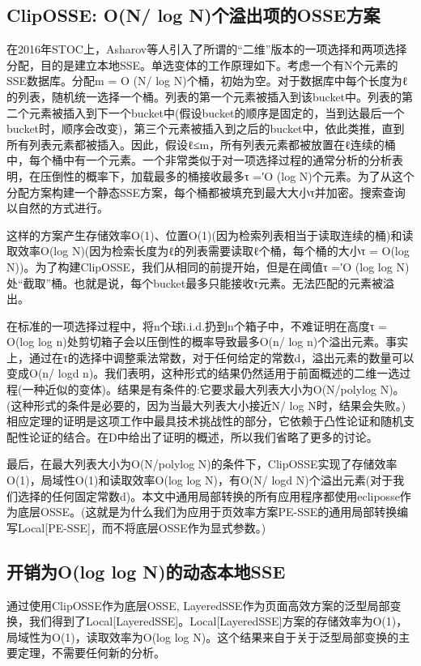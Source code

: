 \documentclass[UTF8]{article}
\begin{document}
\subsection{ClipOSSE: O(N/ log N)个溢出项的OSSE方案}
在2016年STOC上，Asharov等人引入了所谓的“二维”版本的一项选择和两项选择分配，目的是建立本地SSE。单选变体的工作原理如下。考虑一个有N个元素的SSE数据库。分配m = O (N/ log N)个桶，初始为空。对于数据库中每个长度为ℓ的列表，随机统一选择一个桶。列表的第一个元素被插入到该bucket中。列表的第二个元素被插入到下一个bucket中(假设bucket的顺序是固定的，当到达最后一个bucket时，顺序会改变)，第三个元素被插入到之后的bucket中，依此类推，直到所有列表元素都被插入。因此，假设ℓ≤m，所有列表元素都被放置在ℓ连续的桶中，每个桶中有一个元素。一个非常类似于对一项选择过程的通常分析的分析表明，在压倒性的概率下，加载最多的桶接收最多τ =′O (log N)个元素。为了从这个分配方案构建一个静态SSE方案，每个桶都被填充到最大大小τ并加密。搜索查询以自然的方式进行。

这样的方案产生存储效率O(1)、位置O(1)(因为检索列表相当于读取连续的桶)和读取效率O(log N)(因为检索长度为ℓ的列表需要读取ℓ个桶，每个桶的大小τ = O(log N))。为了构建ClipOSSE，我们从相同的前提开始，但是在阈值τ =′O (log log N)处“截取”桶。也就是说，每个bucket最多只能接收τ元素。无法匹配的元素被溢出。

在标准的一项选择过程中，将n个球i.i.d.扔到n个箱子中，不难证明在高度τ = O(log log n)处剪切箱子会以压倒性的概率导致最多O(n/ log n)个溢出元素。事实上，通过在τ的选择中调整乘法常数，对于任何给定的常数d，溢出元素的数量可以变成O(n/ logd n)。我们表明，这种形式的结果仍然适用于前面概述的二维一选过程(一种近似的变体)。结果是有条件的:它要求最大列表大小为O(N/polylog N)。(这种形式的条件是必要的，因为当最大列表大小接近N/ log N时，结果会失败。)相应定理的证明是这项工作中最具技术挑战性的部分，它依赖于凸性论证和随机支配性论证的结合。在D中给出了证明的概述，所以我们省略了更多的讨论。

最后，在最大列表大小为O(N/polylog N)的条件下，ClipOSSE实现了存储效率O(1)，局域性O(1)和读取效率O(log log N)，有O(N/ logd N)个溢出元素(对于我们选择的任何固定常数d)。本文中通用局部转换的所有应用程序都使用ecliposse作为底层OSSE。(这就是为什么我们为应用于页效率方案PE-SSE的通用局部转换编写Local[PE-SSE]，而不将底层OSSE作为显式参数。)

\subsection{开销为O(log log N)的动态本地SSE}
通过使用ClipOSSE作为底层OSSE, LayeredSSE作为页面高效方案的泛型局部变换，我们得到了Local[LayeredSSE]。Local[LayeredSSE]方案的存储效率为O(1)，局域性为O(1)，读取效率为O(log log N)。这个结果来自于关于泛型局部变换的主要定理，不需要任何新的分析。
\end{document}
